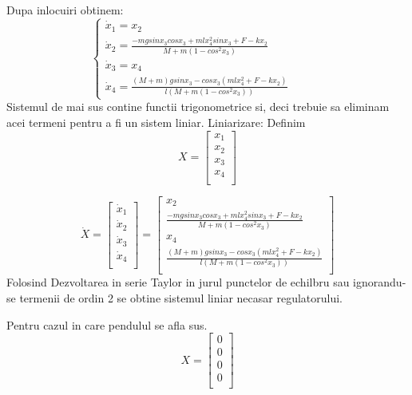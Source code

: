 \documentclass[12pt]{article}
\begin{document}
Dupa inlocuiri obtinem:
\[
\left\{ 
\begin{array}{c}
\dot x_1 = x_2 {~~~~~~~~~~~~~~~~~~~~~~~~~~~~~~~~~~~~~~~~~~~~~~~~}\\ 
\dot x_2 =  \frac{-mgsin x_3 cos x_3 + mlx_4^2 sin x_3 + F - k x_2}{M+m(1-cos^2x_3)}{~~~~~~~~~~~~~~}\\
\dot x_3 =  x_4{~~~~~~~~~~~~~~~~~~~~~~~~~~~~~~~~~~~~~~~~~~~~~~~}\\
\dot x_4 = \frac{(M+m)gsinx_3 - cosx_3(mlx_4^2 + F - k x_2)}{l(M+m(1-cos^2 x_3))}{~~~~~~~~~~~~~}
\end{array}
\right. 
\]\newline
Sistemul de mai sus contine functii trigonometrice si, deci trebuie sa eliminam acei termeni pentru a fi un sistem liniar. \newline \newline
Liniarizare: \newline\newline
Definim  \[  X = 
 \left[\begin{array}{r}
   x_1\\
     x_2\\
   x_3\\ 
	 x_4\\
   \end{array} \right]
\]\newline  

\[\dot  X = 
 \left[\begin{array}{r}
  \dot x_1\\
    \dot x_2\\
   \dot x_3\\ 
	\dot x_4\\
   \end{array} \right]
 =\left[\begin{array}{r}
 x_2{~~~~~~~~~~~~~~~~~~~}\\
 \frac{-mgsin x_3 cos x_3 + mlx_4^2 sin x_3 + F - k x_2}{M+m(1-cos^2x_3)}\\
 x_4{~~~~~~~~~~~~~~~~~~~}\\
 \frac{(M+m)gsinx_3 - cosx_3(mlx_4^2 + F - k x_2)}{l(M+m(1-cos^2 x_3))}\\
\end{array}\right]
\]\newline
Folosind Dezvoltarea in serie Taylor in jurul punctelor de echilbru sau ignorandu-se termenii de ordin 2 se obtine sistemul liniar necasar regulatorului. \newline

Pentru cazul in care pendulul se afla sus.
 \[  X = 
 \left[\begin{array}{r}
   0\\
     0\\
   0\\ 
	 0\\
   \end{array} \right]
\]\newline
\end{document}
